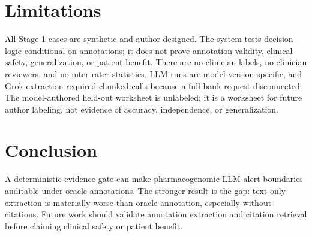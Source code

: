 \documentclass[pmlr,twocolumn,10pt]{jmlr}
\begin{document}
\section{Limitations}
All Stage 1 cases are synthetic and author-designed.
The system tests decision logic conditional on annotations; it does not prove annotation validity, clinical safety, generalization, or patient benefit.
There are no clinician labels, no clinician reviewers, and no inter-rater statistics.
LLM runs are model-version-specific, and Grok extraction required chunked calls because a full-bank request disconnected.
The model-authored held-out worksheet is unlabeled; it is a worksheet for future author labeling, not evidence of accuracy, independence, or generalization.

\section{Conclusion}
A deterministic evidence gate can make pharmacogenomic LLM-alert boundaries auditable under oracle annotations.
The stronger result is the gap: text-only extraction is materially worse than oracle annotation, especially without citations.
Future work should validate annotation extraction and citation retrieval before claiming clinical safety or patient benefit.

\clearpage
\appendix
\onecolumn



\end{document}
